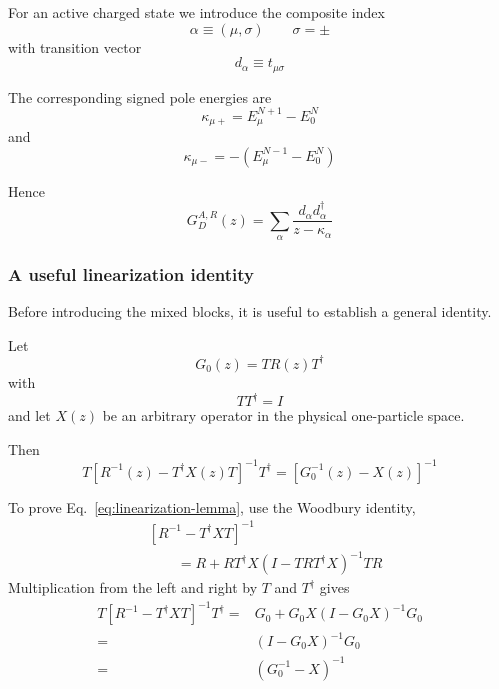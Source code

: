 \documentclass[aip,jcp,reprint,noshowkeys,superscriptaddress]{revtex4-1}
\begin{document}
For an active charged state we introduce the composite index
\begin{equation}
  \alpha
  \equiv
  (\mu,\sigma)
  \qquad
  \sigma=\pm
\end{equation}
with transition vector
\begin{equation}
  d_\alpha
  \equiv
  t_{\mu\sigma}
\end{equation}

The corresponding signed pole energies are
\begin{equation}
  \kappa_{\mu+}
  =
  E_{\mu}^{N+1}-E_0^N
\end{equation}
and
\begin{equation}
  \kappa_{\mu-}
  =
  -
  \left(
    E_{\mu}^{N-1}-E_0^N
  \right)
\end{equation}

Hence
\begin{equation}
  G_D^{A,R}(z)
  =
  \sum_\alpha
  \frac{
    d_\alpha d_\alpha^\dagger
  }{
    z-\kappa_\alpha
  }
\end{equation}


\subsubsection{A useful linearization identity}

Before introducing the mixed blocks, it is useful to establish a
general identity.

Let
\begin{equation}
  G_0(z)
  =
  TR(z)T^\dagger
\end{equation}
with
\begin{equation}
  TT^\dagger=I
\end{equation}
and let $X(z)$ be an arbitrary operator in the physical one-particle
space.

Then
\begin{equation}
  T
  \left[
    R^{-1}(z)
    -
    T^\dagger X(z)T
  \right]^{-1}
  T^\dagger
  =
  \left[
    G_0^{-1}(z)-X(z)
  \right]^{-1}
  \label{eq:linearization-lemma}
\end{equation}

To prove Eq.~\eqref{eq:linearization-lemma}, use the Woodbury identity,
\begin{equation}
  \begin{aligned}
  &
  \left[
    R^{-1}
    -
    T^\dagger XT
  \right]^{-1}
  \\
  &\qquad
  =
  R
  +
  RT^\dagger
  X
  \left(
    I-TRT^\dagger X
  \right)^{-1}
  TR
  \end{aligned}
\end{equation}
Multiplication from the left and right by $T$ and $T^\dagger$ gives
\begin{equation}
  \begin{aligned}
  T
  \left[
    R^{-1}
    -
    T^\dagger XT
  \right]^{-1}
  T^\dagger
  ={}&
  G_0
  +
  G_0X
  \left(
    I-G_0X
  \right)^{-1}
  G_0
  \\
  ={}&
  \left(
    I-G_0X
  \right)^{-1}
  G_0
  \\
  ={}&
  \left(
    G_0^{-1}-X
  \right)^{-1}
  \end{aligned}
\end{equation}
\end{document}
